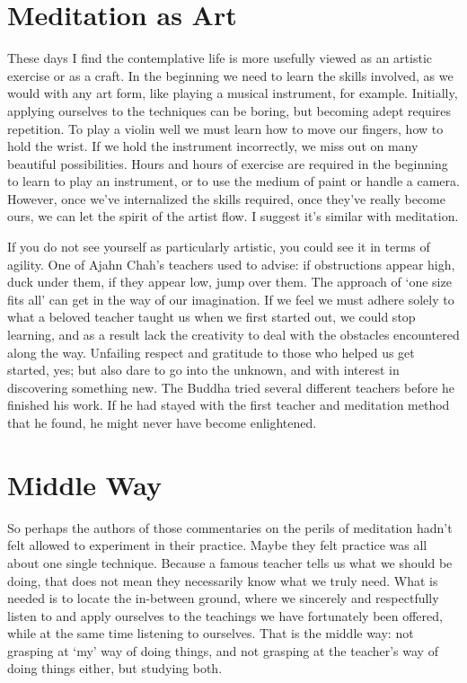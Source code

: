 \section{Meditation as Art}

These days I find the contemplative life is more usefully viewed as an
artistic exercise or as a craft. In the beginning we need to learn the
skills involved, as we would with any art form, like playing a musical
instrument, for example. Initially, applying ourselves to the techniques
can be boring, but becoming adept requires repetition. To play a violin
well we must learn how to move our fingers, how to hold the wrist. If we
hold the instrument incorrectly, we miss out on many beautiful
possibilities. Hours and hours of exercise are required in the beginning
to learn to play an instrument, or to use the medium of paint or handle
a camera. However, once we’ve internalized the skills required, once
they’ve really become ours, we can let the spirit of the artist flow. I
suggest it’s similar with meditation.

If you do not see yourself as particularly artistic, you could see it in
terms of agility. One of Ajahn Chah’s teachers used to advise: if
obstructions appear high, duck under them, if they appear low, jump over
them. The approach of ‘one size fits all’ can get in the way of our
imagination. If we feel we must adhere solely to what a beloved teacher
taught us when we first started out, we could stop learning, and as a
result lack the creativity to deal with the obstacles encountered along
the way. Unfailing respect and gratitude to those who helped us get
started, yes; but also dare to go into the unknown, and with interest in
discovering something new. The Buddha tried several different teachers
before he finished his work. If he had stayed with the first teacher and
meditation method that he found, he might never have become enlightened.

\section{Middle Way}

So perhaps the authors of those commentaries on the perils of meditation
hadn’t felt allowed to experiment in their practice. Maybe they felt
practice was all about one single technique. Because a famous teacher
tells us what we should be doing, that does not mean they necessarily
know what we truly need. What is needed is to locate the in-between
ground, where we sincerely and respectfully listen to and apply
ourselves to the teachings we have fortunately been offered, while at
the same time listening to ourselves. That is the middle way: not
grasping at ‘my’ way of doing things, and not grasping at the teacher’s
way of doing things either, but studying both.


